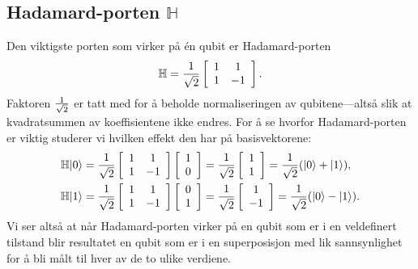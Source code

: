 \subsection{Hadamard-porten $\mathbb{H}$}
Den viktigste porten som virker på \'en qubit er Hadamard-porten
\begin{displaymath}
	\mathbb{H} = \frac{1}{\sqrt{2}} \left[\begin{array}{cc}1 & 1 \\ 1 & -1 \end{array}\right].
\end{displaymath}
Faktoren $\frac{1}{\sqrt{2}}$ er tatt med for å beholde normaliseringen av qubitene---altså slik at kvadratsummen av koeffisientene ikke endres. For å se hvorfor Hadamard-porten er viktig studerer vi hvilken effekt den har på basisvektorene:
\begin{align*}
	\mathbb{H}|0\rangle &= \frac{1}{\sqrt{2}}\left[\begin{array}{cc}1 & 1 \\ 1 & -1 \end{array}\right]\left[\begin{array}{c} 1 \\ 0\end{array}\right] 
	= \frac{1}{\sqrt{2}}\left[\begin{array}{c} 1 \\ 1\end{array}\right] = \frac{1}{\sqrt{2}}(|0\rangle + |1\rangle), \\
	\mathbb{H}|1\rangle &= \frac{1}{\sqrt{2}}\left[\begin{array}{cc}1 & 1 \\ 1 & -1 \end{array}\right]\left[\begin{array}{c} 0 \\ 1\end{array}\right] 
	= \frac{1}{\sqrt{2}}\left[\begin{array}{c} 1 \\ -1\end{array}\right] = \frac{1}{\sqrt{2}}(|0\rangle - |1\rangle).
\end{align*}
Vi ser altså at når Hadamard-porten virker på en qubit som er i en veldefinert tilstand blir resultatet en qubit som er i en superposisjon med lik sannsynlighet for å bli målt til hver av de to ulike verdiene.